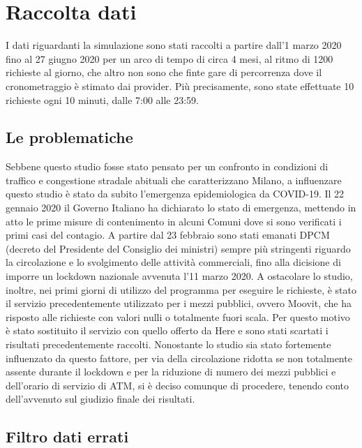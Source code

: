 \section{Raccolta dati}

I dati riguardanti la simulazione sono stati raccolti a partire dall'1 marzo 2020 fino al 27 giugno 2020 per un arco di tempo di circa 4 mesi, al ritmo di 1200 richieste al giorno, che altro non sono che finte gare di percorrenza dove il cronometraggio è stimato dai provider. Più precisamente, sono state effettuate 10 richieste ogni 10 minuti, dalle 7:00 alle 23:59.

\subsection{Le problematiche}

Sebbene questo studio fosse stato pensato per un confronto in condizioni di traffico e congestione stradale abituali che caratterizzano Milano, a influenzare questo studio è stato da subito l'emergenza epidemiologica da COVID-19. Il 22 gennaio 2020 il Governo Italiano ha dichiarato lo stato di emergenza, mettendo in atto le prime misure di contenimento in alcuni Comuni dove si sono verificati i primi casi del contagio. A partire dal 23 febbraio sono stati emanati DPCM (decreto del Presidente del Consiglio dei ministri) sempre più stringenti riguardo la circolazione e lo svolgimento delle attività commerciali, fino alla dicisione di imporre un lockdown nazionale avvenuta l'11 marzo 2020\cite{misuredelgovernopercovid}. A ostacolare lo studio, inoltre, nei primi giorni di utilizzo del programma per eseguire le richieste, è stato il servizio precedentemente utilizzato per i mezzi pubblici, ovvero Moovit, che ha risposto alle richieste con valori nulli o totalmente fuori scala. Per questo motivo è stato sostituito il servizio con quello offerto da Here e sono stati scartati i risultati precedentemente raccolti. Nonostante lo studio sia stato fortemente influenzato da questo fattore, per via della circolazione ridotta se non totalmente assente durante il lockdown e per la riduzione di numero dei mezzi pubblici e dell'orario di servizio di ATM, si è deciso comunque di procedere, tenendo conto dell'avvenuto sul giudizio finale dei risultati.

\subsection{Filtro dati errati}

